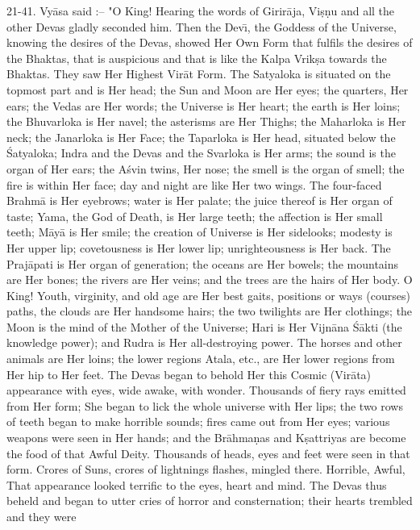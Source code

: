 21-41. Vy\=asa said :-- "O King! Hearing the words of Girir\=aja, Vi\d{s}\d{n}u and all the other Devas gladly seconded him. Then the Dev\={\i}, the Goddess of the Universe, knowing the desires of the Devas, showed Her Own Form that fulfils the desires of the Bhaktas, that is auspicious and that is like the Kalpa Vrik\d{s}a towards the Bhaktas. They saw Her Highest Vir\=at Form. The Satyaloka is situated on the topmost part and is Her head; the Sun and Moon are Her eyes; the quarters, Her ears; the Vedas are Her words; the Universe is Her heart; the earth is Her loins; the Bhuvarloka is Her navel; the asterisms are Her Thighs; the Maharloka is Her neck; the Janarloka is Her Face; the Taparloka is Her head, situated below the \'Satyaloka; Indra and the Devas and the Svarloka is Her arms; the sound is the organ of Her ears; the A\'svin twins, Her nose; the smell is the organ of smell; the fire is within Her face; day and night are like Her two wings. The four-faced Brahm\=a is Her eyebrows; water is Her palate; the juice thereof is Her organ of taste; Yama, the God of Death, is Her large teeth; the affection is Her small teeth; M\=ay\=a is Her smile; the creation of Universe is Her sidelooks; modesty is Her upper lip; covetousness is Her lower lip; unrighteousness is Her back. The Praj\=apati is Her organ of generation; the oceans are Her bowels; the mountains are Her bones; the rivers are Her veins; and the trees are the hairs of Her body. O King! Youth, virginity, and old age are Her best gaits, positions or ways (courses) paths, the clouds are Her handsome hairs; the two twilights are Her clothings; the Moon is the mind of the Mother of the Universe; Hari is Her Vijn\=ana \'S\=akti (the knowledge power); and Rudra is Her all-destroying power. The horses and other animals are Her loins; the lower regions Atala, etc., are Her lower regions from Her hip to Her feet. The Devas began to behold Her this Cosmic (Vir\=ata) appearance with eyes, wide awake, with wonder. Thousands of fiery rays emitted from Her form; She began to lick the whole universe with Her lips; the two rows of teeth began to make horrible sounds; fires came out from Her eyes; various weapons were seen in Her hands; and the Br\=ahma\d{n}as and K\d{s}attriyas are become the food of that Awful Deity. Thousands of heads, eyes and feet were seen in that form. Crores of Suns, crores of lightnings flashes, mingled there. Horrible, Awful, That appearance looked terrific to the eyes, heart and mind. The Devas thus beheld and began to utter cries of horror and consternation; their hearts trembled and they were

